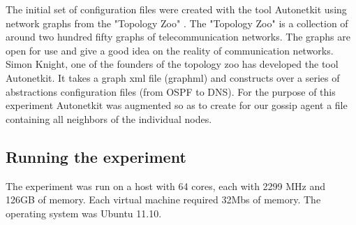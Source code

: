 The initial set of configuration files were created with the tool Autonetkit \cite{autonetkit} using network graphs from the "Topology Zoo" \cite{knight_internet_2011}. The "Topology Zoo" is a collection of around two hundred fifty graphs of telecommunication networks. The graphs are open for use and give a good idea on the reality of communication networks. Simon Knight, one of the founders of the topology zoo has developed the tool Autonetkit. It takes a graph xml file (graphml) and constructs over a series of abstractions configuration files (from OSPF to DNS). For the purpose of this experiment Autonetkit was augmented so as to create for our gossip agent a file containing all neighbors of the individual nodes.

\subsection{Running the experiment}
The experiment was run on a host with 64 cores, each with 2299 MHz and 126GB of memory. Each virtual machine required 32Mbs of memory. The operating system was Ubuntu 11.10.
